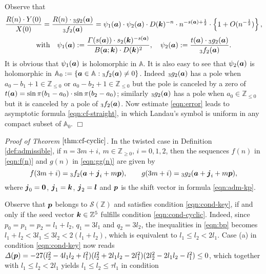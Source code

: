 \documentclass[a4paper,12pt]{article}
\theoremstyle{plain}
\def\A{\mathbb{A}}
\def\Z{\mathbb{Z}}
\def\cS{\mathcal{S}}
\def\vG{\varGamma}
\def\vD{\varDelta}
\def\ba{\mbox{\boldmath $a$}}
\def\sba{\mbox{\boldmath ${\scriptstyle a}$}}
\def\bj{\mbox{\boldmath $j$}}
\def\bk{\mbox{\boldmath $k$}}
\def\bl{\mbox{\boldmath $l$}}
\def\bp{\mbox{\boldmath $p$}}
\def\0{\mbox{\boldmath $0$}}
\begin{document}
Observe that  
\begin{gather*}
\frac{R(n) \cdot Y(0)}{X(0)} = \frac{R(n) \cdot {}_3g_2(\ba)}{{}_3f_2(\ba)} = 
\psi_1(\ba) \cdot \psi_2(\ba) 
\cdot D(\bk)^{-n} \cdot n^{-s(\sba) + \frac{1}{2}} \cdot 
\left\{ 1 + O(n^{-\frac{1}{2} }) \right\}, \\ 
\mbox{with} \quad 
\psi_1(\ba) := \frac{\vG(s(\ba)) \cdot s_2(\bk)^{-s(\sba)}}{B(\ba; \bk) 
\cdot D(\bk)^2},  \quad  
\psi_2(\ba) := \frac{t(\ba) \cdot {}_3g_2(\ba)}{{}_3f_2(\ba)}.     
\end{gather*}
It is obvious that $\psi_1(\ba)$ is holomorphic in $\A$. 
It is also easy to see that $\psi_2(\ba)$ is holomorphic in 
$\A_0 := \{\ba \in \A : {}_3f_2(\ba) \neq 0 \}$. 
Indeed ${}_3g_2(\ba)$ has a pole when $a_0-b_1+1 \in \Z_{\le 0}$ or 
$a_0-b_2+1 \in \Z_{\le 0}$ but the pole is canceled by a zero of $t(\ba) = 
\sin \pi(b_1-a_0) \cdot \sin \pi(b_2-a_0)$; similarly ${}_3g_2(\ba)$ has a 
pole when $a_0 \in \Z_{\le 0}$ but it is canceled by a pole of 
${}_3f_2(\ba)$.         
Now estimate \eqref{eqn:error} leads to asymptotic formula 
\eqref{eqn:cf-straight}, in which Landau's symbol is uniform in 
any compact subset of $\A_0$. \hfill $\Box$ 
\par\medskip\noindent
{\it Proof of Theorem $\ref{thm:cf-cyclic}$}. 
In the twisted case in Definition \ref{def:admissible}, 
if $n = 3 m + i$, $m \in \Z_{\ge0}$, $i = 0, 1, 2$, then the sequences $f(n)$ 
in \eqref{eqn:f(n)} and $g(n)$ in \eqref{eqn:gg(n)} are given by  
\[
f(3 m + i) = {}_3f_2(\ba + \bj_i + m \bp), \qquad 
g(3 m + i) = {}_3g_2(\ba + \bj_i + m \bp),  
\] 
where $\bj_0 = \0$, $\bj_1 = \bk$, $\bj_2 = \bl$ and $\bp$ is the 
shift vector in formula \eqref{eqn:adm-kp}.  
\par
Observe that $\bp$ belongs to $\cS(\Z)$ and satisfies condition 
\eqref{eqn:cond-key},  if and only if the seed vector $\bk \in \Z^5$ 
fulfills condition \eqref{eqn:cond-cyclic}.  
Indeed, since $p_0 = p_1 = p_2 = l_1+l_2$, $q_1 = 3 l_1$ and $q_2 = 3 l_2$, the 
inequalities in \eqref{eqn:bp} becomes 
$l_1 + l_2 < 3 l_1 \le 3 l_2 < 2(l_1 + l_2)$, which is equivalent to $l_1 \le l_2 < 2 l_1$. 
Case (a) in condition \eqref{eqn:cond-key} now reads 
$\vD(\bp) = -27(l_2^2-4 l_1 l_2 + l_1^2) (l_2^2+2 l_1 l_2 -2l_1^2) 
(2 l_2^2 -2l_1 l_2-l_1^2) \le 0$,  
which together with $l_1 \le l_2 < 2 l_1$ yields $l_1 \le l_2 \le \tau l_1$ in condition 
\end{document}
